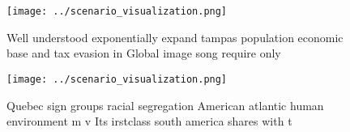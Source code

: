 \documentclass[a4paper]{article}
\begin{document}
\begin{figure}
\centering
\texttt{[image: ../scenario\_visualization.png]}
\caption{Well understood exponentially expand tampas population economic base and tax evasion in Global image song require only 
}
\end{figure}
 
\begin{figure}
\centering
\texttt{[image: ../scenario\_visualization.png]}
\caption{Quebec sign groups racial segregation American atlantic human environment m v Its irstclass south america shares with t
}
\end{figure}
 
\end{document}
